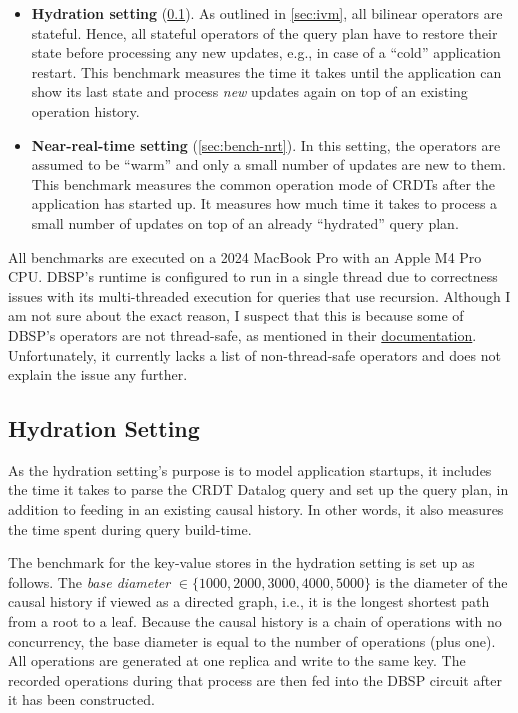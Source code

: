 \begin{itemize}
	\item \textbf{Hydration setting} (\ref{sec:bench-hydration}).
	      As outlined in \ref{sec:ivm}, all bilinear operators are stateful.
	      Hence, all stateful operators of the query plan have to restore
	      their state before processing any new updates, e.g., in case of a
		  ``cold'' application restart. This benchmark measures the time it takes
	      until the application can show its last state and process \emph{new}
		  updates again on top of an existing operation history.
	\item \textbf{Near-real-time setting} (\ref{sec:bench-nrt}).
	      In this setting, the operators are assumed to be ``warm'' and only
	      a small number of updates are new to them.
	      This benchmark measures the common operation mode of \acp{CRDT} after
		  the application has started up. It measures how much time it takes
		  to process a small number of updates on top of an already ``hydrated''
		  query plan.
\end{itemize}

All benchmarks are executed on a 2024 MacBook Pro with an Apple M4 Pro CPU.
DBSP's runtime is configured to run in a single thread due to correctness
issues with its multi-threaded execution for queries that use recursion.
Although I am not sure about the exact reason,
I suspect that this is because some of DBSP's operators are not thread-safe,
as mentioned in their
\href{https://docs.rs/dbsp/0.64.0/dbsp/circuit/struct.Runtime.html\#method.init_circuit}{documentation}.
Unfortunately, it currently lacks a list of non-thread-safe operators
and does not explain the issue any further\footnotemark{}.


\subsection{Hydration Setting}\label{sec:bench-hydration}

As the hydration setting's purpose is to model application startups,
it includes the time it takes to parse the \ac{CRDT} Datalog query and
set up the query plan, in addition to feeding in an existing causal history.
In other words, it also measures the time spent during query build-time.

The benchmark for the key-value stores in the hydration setting is set up as follows.
The \emph{base diameter} \(\in \{1000, 2000, 3000, 4000, 5000\}\) is the diameter
of the causal history if viewed as a directed graph,
i.e., it is the longest shortest path from a root to a leaf.
Because the causal history is a chain of operations with no concurrency,
the base diameter is equal to the number of operations (plus one).
All operations are generated at one replica and write to the same key.
The recorded operations during that process are then fed into the DBSP circuit
after it has been constructed.

